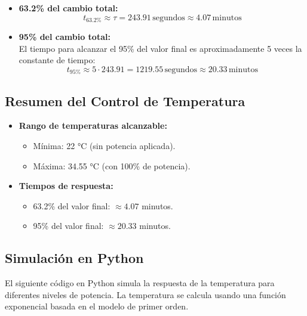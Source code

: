 \documentclass[spanish, a4paper, 11pt]{article}
\begin{document}
\begin{itemize}
    \item \textbf{63.2\% del cambio total:}
    \[
    t_{63.2\%} \approx \tau = 243.91 \, \text{segundos} \approx 4.07 \, \text{minutos}
    \]

    \item \textbf{95\% del cambio total:} \\
    El tiempo para alcanzar el 95\% del valor final es aproximadamente 5 veces la constante de tiempo:
    \[
    t_{95\%} \approx 5 \cdot 243.91 = 1219.55 \, \text{segundos} \approx 20.33 \, \text{minutos}
    \]
\end{itemize}

\subsection{Resumen del Control de Temperatura}

\begin{itemize}
    \item \textbf{Rango de temperaturas alcanzable:}
    \begin{itemize}
        \item Mínima: 22 °C (sin potencia aplicada).
        \item Máxima: 34.55 °C (con 100\% de potencia).
    \end{itemize}
    \item \textbf{Tiempos de respuesta:}
    \begin{itemize}
        \item 63.2\% del valor final: $\approx 4.07$ minutos.
        \item 95\% del valor final: $\approx 20.33$ minutos.
    \end{itemize}
\end{itemize}

\subsection{Simulación en Python}

El siguiente código en Python simula la respuesta de la temperatura para diferentes niveles de potencia. La temperatura se calcula usando una función exponencial basada en el modelo de primer orden.
\end{document}

